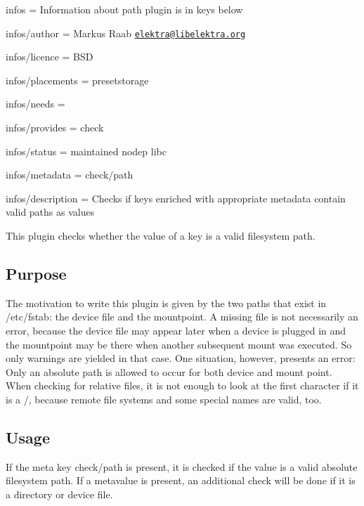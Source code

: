 
\begin{DoxyItemize}
\item infos = Information about path plugin is in keys below
\item infos/author = Markus Raab \href{mailto:elektra@libelektra.org}{\tt elektra@libelektra.\+org}
\item infos/licence = B\+S\+D
\item infos/placements = presetstorage
\item infos/needs =
\item infos/provides = check
\item infos/status = maintained nodep libc
\item infos/metadata = check/path
\item infos/description = Checks if keys enriched with appropriate metadata contain valid paths as values
\end{DoxyItemize}

This plugin checks whether the value of a key is a valid filesystem path.

\subsection*{Purpose}

The motivation to write this plugin is given by the two paths that exist in /etc/fstab\+: the device file and the mountpoint. A missing file is not necessarily an error, because the device file may appear later when a device is plugged in and the mountpoint may be there when another subsequent mount was executed. So only warnings are yielded in that case. One situation, however, presents an error\+: Only an absolute path is allowed to occur for both device and mount point. When checking for relative files, it is not enough to look at the first character if it is a {\ttfamily /}, because remote file systems and some special names are valid, too.

\subsection*{Usage}

If the meta key {\ttfamily check/path} is present, it is checked if the value is a valid absolute filesystem path. If a metavalue is present, an additional check will be done if it is a directory or device file. 